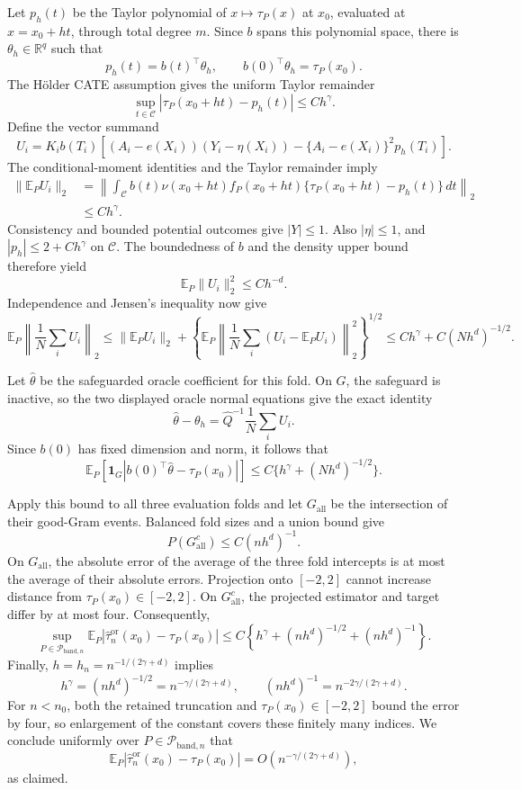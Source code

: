Let \(p_h(t)\) be the Taylor polynomial of \(x\mapsto\tau_P(x)\) at \(x_0\), evaluated at \(x=x_0+ht\), through total degree \(m\).  Since \(b\) spans this polynomial space, there is \(\theta_h\in\mathbb R^q\) such that
\[
p_h(t)=b(t)^\top\theta_h,
\qquad
b(0)^\top\theta_h=\tau_P(x_0).
\]
The H\"older CATE assumption gives the uniform Taylor remainder
\[
\sup_{t\in\mathcal C}
|\tau_P(x_0+ht)-p_h(t)|\leq Ch^\gamma.
\]
Define the vector summand
\[
U_i=K_i b(T_i)\left[
(A_i-e(X_i))(Y_i-\eta(X_i))
-\{A_i-e(X_i)\}^2p_h(T_i)
\right].
\]
The conditional-moment identities and the Taylor remainder imply
\[
\begin{aligned}
\lVert\mathbb E_P U_i\rVert_2
&=\left\lVert
\int_{\mathcal C}b(t)\nu(x_0+ht)f_P(x_0+ht)
\{\tau_P(x_0+ht)-p_h(t)\}\,dt
\right\rVert_2\\
&\leq Ch^\gamma.
\end{aligned}
\]
Consistency and bounded potential outcomes give \(|Y|\leq1\).  Also \(|\eta|\leq1\), and \(|p_h|\leq2+Ch^\gamma\) on \(\mathcal C\).  The boundedness of \(b\) and the density upper bound therefore yield
\[
\mathbb E_P\lVert U_i\rVert_2^2\leq Ch^{-d}.
\]
Independence and Jensen's inequality now give
\[
\mathbb E_P\left\lVert\frac1N\sum_iU_i\right\rVert_2
\leq
\lVert\mathbb E_PU_i\rVert_2
+\left\{
\mathbb E_P\left\lVert
\frac1N\sum_i(U_i-\mathbb E_PU_i)
\right\rVert_2^2
\right\}^{1/2}
\leq Ch^\gamma+C(Nh^d)^{-1/2}.
\]

Let \(\widehat\theta\) be the safeguarded oracle coefficient for this fold.  On \(G\), the safeguard is inactive, so the two displayed oracle normal equations give the exact identity
\[
\widehat\theta-\theta_h
=\widehat Q^{-1}\frac1N\sum_iU_i.
\]
Since \(b(0)\) has fixed dimension and norm, it follows that
\[
\mathbb E_P\!\left[
\mathbf 1_G
\left|b(0)^\top\widehat\theta-\tau_P(x_0)\right|
\right]
\leq C\{h^\gamma+(Nh^d)^{-1/2}\}.
\]

Apply this bound to all three evaluation folds and let \(G_{\mathrm{all}}\) be the intersection of their good-Gram events.  Balanced fold sizes and a union bound give
\[
P(G_{\mathrm{all}}^c)\leq C(nh^d)^{-1}.
\]
On \(G_{\mathrm{all}}\), the absolute error of the average of the three fold intercepts is at most the average of their absolute errors.  Projection onto \([-2,2]\) cannot increase distance from \(\tau_P(x_0)\in[-2,2]\).  On \(G_{\mathrm{all}}^c\), the projected estimator and target differ by at most four.  Consequently,
\[
\sup_{P\in\mathcal P_{\mathrm{band},n}}
\mathbb E_P\left|
\widehat\tau_n^{\mathrm{or}}(x_0)-\tau_P(x_0)
\right|
\leq
C\left\{h^\gamma+(nh^d)^{-1/2}+(nh^d)^{-1}\right\}.
\]
Finally, \(h=h_n=n^{-1/(2\gamma+d)}\) implies
\[
h^\gamma=(nh^d)^{-1/2}=n^{-\gamma/(2\gamma+d)},
\qquad
(nh^d)^{-1}=n^{-2\gamma/(2\gamma+d)}.
\]
For \(n<n_0\), both the retained truncation and \(\tau_P(x_0)\in[-2,2]\) bound the error by four, so enlargement of the constant covers these finitely many indices.  We conclude uniformly over \(P\in\mathcal P_{\mathrm{band},n}\) that
\[
\mathbb E_P\left|
\widehat\tau_n^{\mathrm{or}}(x_0)-\tau_P(x_0)
\right|
=O\!\left(n^{-\gamma/(2\gamma+d)}\right),
\]
as claimed.